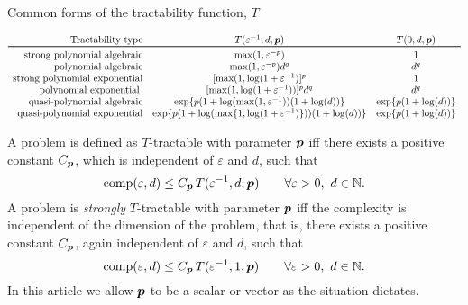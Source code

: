 \documentclass[11pt,a4paper]{article}
\begin{document}
\begin{table} 
    \caption{Common forms of the tractability function, $T$}
{\small
\begin{equation*}
	\begin{array}{r@{\quad}c@{\quad}cc}
		\text{Tractability type} & T(\varepsilon^{-1},d,\vp)
		& T(0,d,\vp)\\
		\toprule
		\text{strong polynomial algebraic} & \max(1,\varepsilon^{-p}) & 1\\
		\text{polynomial algebraic} & \max(1,\varepsilon^{-p})d^{q} & d^{q}\\
		\text{strong polynomial exponential} &  [\max(1,\log(1 + \varepsilon^{-1})]^p & 1\\
		\text{polynomial exponential } &
		[\max(1,\log(1 + \varepsilon^{-1}))]^p  d^{q} & d^{q} \\
        \text{quasi-polynomial algebraic} & 
        \exp\{p(1+\log(\max(1,\varepsilon^{-1}))(1+\log(d))\} &
        \exp\{p(1+\log(d))\}\\
        \text{quasi-polynomial exponential} & 
        \exp\{p(1+\log(\max\{1,\log(1+\varepsilon^{-1})\}))(1+\log(d))\} &
        \exp\{p(1+\log(d))\}
	\end{array}
\end{equation*}}
\label{tab:commonT}
\end{table}

A problem is defined as $T$-tractable with parameter $\boldsymbol{p}$ iff there exists a positive constant $C_{\boldsymbol{p}}$, which is independent of $\varepsilon$ and $d$, such that
\begin{equation} \label{eq:tract_def}
	\operatorname{comp}(\varepsilon,d) \le C_{\boldsymbol{p}}\, T(\varepsilon^{-1},d,\boldsymbol{p}) \qquad \forall \varepsilon >0, \ d \in \mathbb{N}.
\end{equation}
A problem is \emph{strongly}
$T$-tractable with parameter $\boldsymbol{p}$ iff the complexity is independent of the dimension of the problem, that is, there exists a positive constant $C_{\boldsymbol{p}}$, again independent of $\varepsilon$ and $d$, such that
\begin{equation} \label{eq:strong_tract_def}
	\operatorname{comp}(\varepsilon,d) \le C_{\boldsymbol{p}}\, T(\varepsilon^{-1},1,\boldsymbol{p}) \qquad \forall \varepsilon >0 , \ d \in \mathbb{N}.
\end{equation}
In this article we allow $\boldsymbol{p}$ to be a scalar or vector as the situation dictates.
\end{document}
